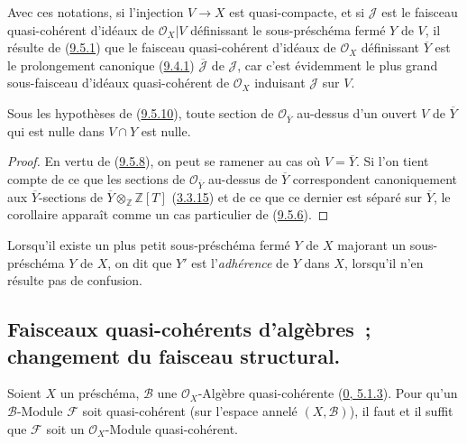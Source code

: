 Avec ces notations, si l'injection $V\to X$ est quasi-compacte, et si
$\mathscr{J}$ est le faisceau quasi-cohérent d'idéaux de
$\mathscr{O}_X|V$ définissant le sous-préschéma fermé $Y$ de $V$, il résulte
de (\hyperref[I.9.5.1-fr]{9.5.1}) que le faisceau quasi-cohérent d'idéaux de
$\mathscr{O}_X$ définissant $\overline{Y}$ est le prolongement canonique
(\hyperref[I.9.4.1-fr]{9.4.1}) $\overline{\mathscr{J}}$ de $\mathscr{J}$,
car c'est évidemment le plus grand sous-faisceau d'idéaux quasi-cohérent de
$\mathscr{O}_X$ induisant $\mathscr{J}$ sur $V$.
\begin{corollary}[9.5.11]
\label{I.9.5.11-fr}
Sous les hypothèses de (\hyperref[I.9.5.10-fr]{9.5.10}), toute section de
$\mathscr{O}_{\overline{Y}}$ au-dessus d'un ouvert $V$ de $\overline{Y}$
qui est nulle dans $V\cap Y$ est nulle.
\end{corollary}

\begin{proof}
En vertu de (\hyperref[I.9.5.8-fr]{9.5.8}), on peut se ramener au cas où
$V=\overline{Y}$. Si l'on tient compte de ce que les sections de
$\mathscr{O}_{\overline{Y}}$ au-dessus de $\overline{Y}$ correspondent
canoniquement aux $\overline{Y}$-sections de
$\overline{Y}\otimes_{\mathbb{Z}}\mathbb{Z}[T]$
(\hyperref[I.3.3.15-fr]{3.3.15}) et de ce que ce dernier est séparé sur
$\overline{Y}$, le corollaire apparaît comme un cas particulier de
(\hyperref[I.9.5.6-fr]{9.5.6}).
\end{proof}

Lorsqu'il existe un plus petit sous-préschéma fermé $Y$ de $X$
majorant un sous-préschéma $Y$ de $X$, on dit que $Y'$ est
l'\emph{adhérence} de $Y$ dans $X$, lorsqu'il n'en résulte pas de
confusion.

\subsection{Faisceaux quasi-cohérents d'algèbres~; changement du faisceau
structural.}
\label{subsection:I.9.6-fr}

\begin{proposition}[9.6.1]
\label{I.9.6.1-fr}
Soient $X$ un préschéma, $\mathscr{B}$ une $\mathscr{O}_X$-Algèbre
quasi-cohérente (\hyperref[0.5.1.3-fr]{0, 5.1.3}). Pour qu'un
$\mathscr{B}$-Module $\mathscr{F}$ soit quasi-cohérent (sur l'espace
annelé $(X,\mathscr{B})$), il faut et il suffit que $\mathscr{F}$ soit un
$\mathscr{O}_X$-Module quasi-cohérent.
\end{proposition}

